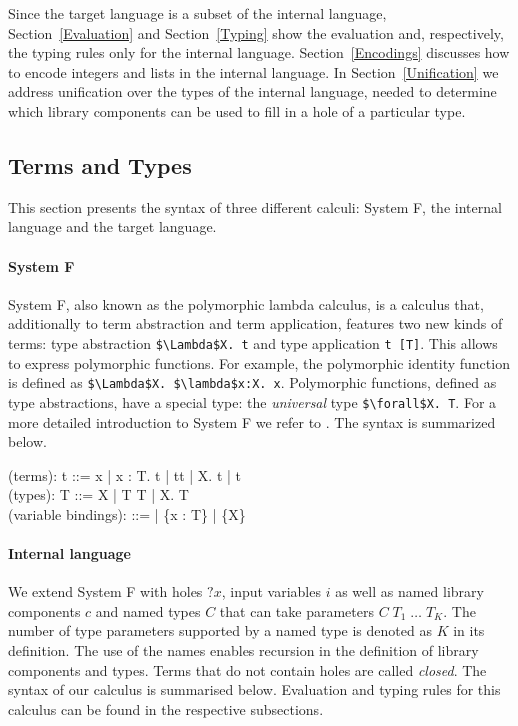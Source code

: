 Since the target language is a subset of the internal language, Section~\ref{Evaluation} and Section~\ref{Typing} show the evaluation and, respectively, the typing rules only for the internal language.
Section~\ref{Encodings} discusses how to encode integers and lists in the internal language. In Section~\ref{Unification} we address unification over the types of the internal language, needed to determine which library components can be used to fill in a hole of a particular type.

  \subsection{Terms and Types}\label{Term and types}
This section presents the syntax of three different calculi: System F, the internal language and the target language.

\paragraph{System F} System F, also known as the polymorphic lambda calculus, is a calculus that, additionally to term abstraction and term application, features two new kinds of terms: type abstraction \lstinline!$\Lambda$X. t! and type application \lstinline!t [T]!. This allows to express polymorphic functions. For example, the polymorphic identity function is defined as \lstinline!$\Lambda$X. $\lambda$x:X. x!.
Polymorphic functions, defined as type abstractions, have a special type: the \emph{universal} type \lstinline!$\forall$X. T!. For a more detailed introduction to System F we refer to \cite{pierce2002types}. The syntax is summarized below.

 \begin{plstx}
(terms): t ::= x | \lambda x : T.\; t | t\;t | \Lambda X.\; t | t\;[T]\\
(types): T ::= X | T \rightarrow T | \forall X.\; T\\
(variable bindings): \Gamma ::= \emptyset | \Gamma \cup \{x : T\} | \Gamma \cup \{X\}\\
\end{plstx}


\paragraph{Internal language} We extend System F with holes $?x$, input variables $i$ as well as named library components $c$ and named types $C$ that can take parameters $C\; T_1\;\ldots\; T_K$. The number of type parameters supported by a named type is denoted as $K$ in its definition. The use of the names enables recursion in the definition of library components and types. Terms that do not contain holes are called \emph{closed}.
The syntax of our calculus is summarised below. Evaluation and typing rules for this calculus can be found in the respective subsections.

